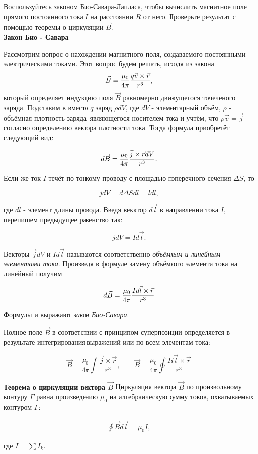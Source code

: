 \documentclass[__main__.tex]{subfiles}
\begin{document}
Воспользуйтесь законом Био-Савара-Лапласа, чтобы вычислить магнитное поле прямого постоянного тока $I$ на расстоянии $R$ от него. Проверьте результат с помощью теоремы о циркуляции $\vec{B}$.\\

\textbf{Закон Био - Савара}

Рассмотрим вопрос о нахождении магнитного поля, создаваемого постоянными электрическими токами. Этот вопрос будем решать, исходя из закона
\begin{gather}
    \llabel{1}
    \vec{B} = \frac{\mu_0}{4\pi} \frac{q\vec{v}\times\vec{r}}{r^3},
\end{gather}
который определяет индукцию поля $\vec{B}$ равномерно  движущегося точеченого заряда. Подставим в  вместо $q$ заряд $\rho dV$, где $dV$ - элементарный объём, $\rho$ - объёмная плотность заряда, являющегося носителем тока и учтём, что $\rho \vec{v} = \vec{j}$ согласно определению вектора плотности тока. Тогда формула  приобретёт следующий вид:

\begin{gather}
    \llabel{2}
    d\vec{B}= \frac{\mu_0}{4\pi} \frac{\vec{j}\times\vec{r}dV}{r^3}.
\end{gather}

Если же ток $I$ течёт по тонкому проводу с площадью поперечного сечения $\Delta S$, то

$$j dV = d \Delta S dl = l dl,$$

где $dl$ - элемент длины провода. Введя векктор $d\vec{l}$ в направлении тока $I$, перепишем предыдущее равенство так:

$$j dV = I d\vec{l}.$$

Векторы $\vec{j} dV$ и $I d\vec{l}$ называются соответственно \textit{объёмным и линейным элементами тока}. Произведя в формуле  замену объёмного элемента тока на линейный получим

\begin{gather}
    \llabel{3}
    d\vec{B} = \frac{\mu_0}{4\pi} \frac{Id\vec{l}\times\vec{r}}{r^3}
\end{gather}

Формулы  и  выражают \textit{закон Био-Савара}.

Полное поле $\vec{B}$ в соответствии с принципом суперпозиции определяется в результате интегрирования выражений  или  по всем элементам тока:

$$
    \vec{B} = \frac{\mu_0}{4\pi} \int \frac{\vec{j}\times\vec{r}}{r^3},
    \qquad
    \vec{B} = \frac{\mu_0}{4\pi}\oint \frac{I d\vec{l}\times\vec{r}}{r^3}
$$

\textbf{Теорема о циркуляции вектора $\vec{B}$}
Циркуляция вектора $\vec{B}$ по произвольному контуру $\Gamma$ равна произведению $\mu_0$ на алгебраическую сумму токов, охватываемых контуром $\Gamma$:

\begin{gather}
    \oint \vec{B} d\vec{l} = \mu_0 I,
\end{gather}

где $I = \sum I_k$.
\end{document}
